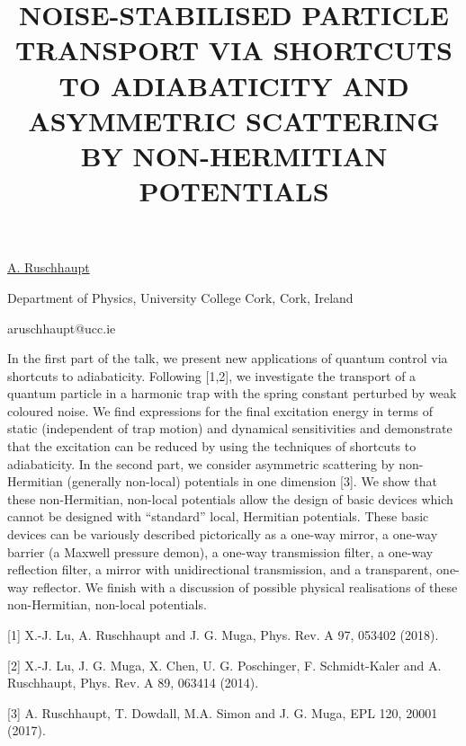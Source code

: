 \title{NOISE-STABILISED PARTICLE TRANSPORT VIA SHORTCUTS TO ADIABATICITY AND ASYMMETRIC SCATTERING BY NON-HERMITIAN POTENTIALS}

\underline{A. Ruschhaupt}  

{\normalsize{\vspace{-4mm}
Department of Physics,
University College Cork,
Cork,
Ireland



\email aruschhaupt@ucc.ie}}

In the first part of the talk, we present new applications of quantum control via shortcuts to adiabaticity. Following [1,2], we  investigate the transport of a quantum particle in a harmonic trap with the spring constant perturbed by weak coloured noise. We find expressions for the final excitation energy in terms of static (independent of trap motion) and dynamical sensitivities and demonstrate that the excitation can be reduced by using the techniques of shortcuts to adiabaticity.
In the second part, we consider asymmetric scattering by non-Hermitian (generally non-local) potentials in one dimension [3]. We show that these non-Hermitian, non-local potentials allow the design of basic devices which cannot be designed with ``standard'' local, Hermitian potentials. These basic devices can be variously described pictorically as a one-way mirror, a one-way barrier (a Maxwell pressure demon), a one-way transmission filter, a one-way reflection filter, a mirror with unidirectional transmission, and a transparent, one-way reflector. We finish with a discussion of possible physical realisations of these non-Hermitian, non-local potentials.

{\normalsize
[1] X.-J. Lu, A. Ruschhaupt and J. G. Muga, Phys. Rev. A 97, 053402 (2018).
\vsp

[2] X.-J. Lu, J. G. Muga, X. Chen, U. G. Poschinger, F. Schmidt-Kaler and A. Ruschhaupt, Phys. Rev. A 89, 063414 (2014).
\vsp

[3] A. Ruschhaupt, T. Dowdall, M.A. Simon and J. G. Muga, EPL 120, 20001 (2017).
}

\vspace{\baselineskip}
